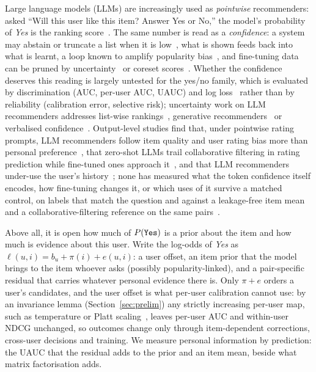 Large language models (LLMs) are increasingly used as \emph{pointwise} recommenders: asked ``Will this user like this item?
Answer Yes or No,'' the model's probability of \emph{Yes} is the ranking score~\citep{bao2023tallrec,zhang2025collm,zhang2024binllm}.
The same number is read as a \emph{confidence}: a system may abstain or truncate a list when it is
low~\citep{fan2026ugr,kweon2024perk}, what is shown feeds back into what is learnt, a loop known to amplify popularity
bias~\citep{chaney2018feedback,mansoury2020feedback}, and fine-tuning data can be pruned by uncertainty~\citep{wu2025unit} or
coreset scores~\citep{lin2024dealrec,mei2025goracs}. Whether the confidence deserves this reading is largely untested for the
yes/no family, which is evaluated by discrimination (AUC, per-user AUC, UAUC) and log loss~\citep{lin2024rella} rather than by
reliability (calibration error, selective risk); uncertainty work on LLM recommenders addresses list-wise
rankings~\citep{kweon2025uqrec,yan2026evirank}, generative recommenders~\citep{fan2026ugr} or verbalised
confidence~\citep{ravikumar2026hallucinating}. Output-level studies find that, under pointwise rating prompts, LLM recommenders
follow item quality and user rating bias more than personal preference~\citep{tan2025perrecbench}, that zero-shot LLMs trail
collaborative filtering in rating prediction while fine-tuned ones approach it~\citep{kang2023llmrating}, and that LLM recommenders
under-use the user's history~\citep{kim2025lostinsequence,zhang2024cft}; none has measured what the token confidence itself encodes,
how fine-tuning changes it, or which uses of it survive a matched control, on labels that match the question and against a
leakage-free item mean and a collaborative-filtering reference on the same pairs~\citep{ferraridacrema2019progress}.

Above all, it is open how much of $P(\texttt{Yes})$ is a prior about the item and how much is evidence about this user. Write the log-odds
of \emph{Yes} as $\ell(u,i)=b_u+\pi(i)+e(u,i)$: a user offset, an item prior that the model brings to the item whoever asks
(possibly popularity-linked), and a pair-specific residual that carries whatever personal evidence there is. Only $\pi+e$ orders
a user's candidates, and the user offset is what per-user calibration cannot use: by an invariance lemma
(Section~\ref{sec:prelim}) any strictly increasing per-user map, such as temperature or Platt
scaling~\citep{guo2017calibration}, leaves per-user AUC and within-user NDCG unchanged, so outcomes change only through
item-dependent corrections, cross-user decisions and training. We measure personal information by prediction: the UAUC that the
residual adds to the prior and an item mean, beside what matrix factorisation adds.

